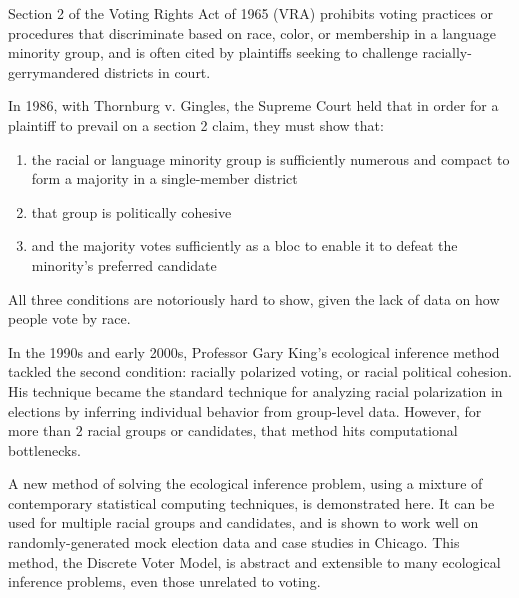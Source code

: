 
Section 2 of the Voting Rights Act of 1965 (VRA) \cite{vra} prohibits voting practices or procedures that discriminate based on race, color, or membership in a language minority group, and is often cited by plaintiffs seeking to challenge racially-gerrymandered districts in court.

In 1986, with Thornburg v. Gingles\cite{thornburg}, the Supreme Court held that in order for a plaintiff to prevail on a section 2 claim, they must show that:

\begin{enumerate}
  \item the racial or language minority group is sufficiently numerous and compact to form a majority in a single-member district
  \item that group is politically cohesive
  \item and the majority votes sufficiently as a bloc to enable it to defeat the minority’s preferred candidate
\end{enumerate}

All three conditions are notoriously hard to show, given the lack of data on how people vote by race.

In the 1990s and early 2000s, Professor Gary King’s ecological inference method tackled the second condition: racially polarized voting, or racial political cohesion. His technique became the standard technique for analyzing racial polarization in elections by inferring individual behavior from group-level data. However, for more than $2$ racial groups or candidates, that method hits computational bottlenecks.

A new method of solving the ecological inference problem, using a mixture of contemporary statistical computing techniques, is demonstrated here. It can be used for multiple racial groups and candidates, and is shown to work well on randomly-generated mock election data and case studies in Chicago. This method, the Discrete Voter Model, is abstract and extensible to many ecological inference problems, even those unrelated to voting.
